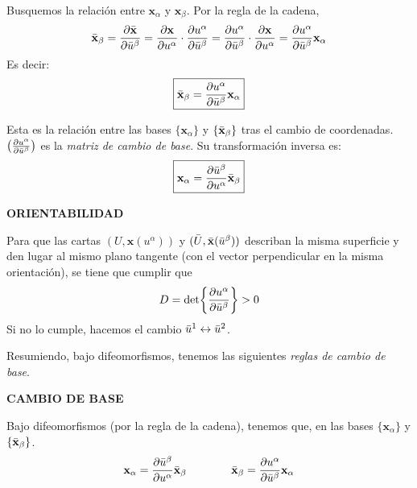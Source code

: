 Busquemos la relación entre $\mathbf{x}_\alpha$ y $\mathbf{x}_\beta$. Por la regla de la cadena,
$$
\Bar{\mathbf{x}}_\beta = \pdv{\Bar{\mathbf{x}}}{\Bar{u}^\beta}=\pdv{\mathbf{x}}{u^\alpha}\cdot \pdv{u^\alpha}{\Bar{u}^\beta}=\pdv{u^\alpha}{\Bar{u}^\beta}\cdot \pdv{\mathbf{x}}{u^\alpha}=\pdv{u^\alpha}{\Bar{u}^\beta}\mathbf{x}_\alpha
$$
Es decir:
$$
\boxed{\Bar{\mathbf{x}}_\beta =\pdv{u^\alpha}{\Bar{u}^\beta}\mathbf{x}_\alpha}
$$

Esta es la relación entre las bases $\{ \mathbf{x}_\alpha  \}$ y $\{ \Bar{\mathbf{x}}_\beta \}$ tras el cambio de coordenadas. $\left ( \pdv{u^\alpha}{\Bar{u}^\beta} \right )$ es la \emph{matriz de cambio de base}. Su transformación inversa es:
$$
\boxed{\mathbf{x}_\alpha=\pdv{\Bar{u}^\beta}{u^\alpha}\Bar{\mathbf{x}}_\beta}
$$
\begin{mybox}
    \begin{center}
        \textbf{ORIENTABILIDAD}
    \end{center}
    Para que las cartas $(U,\mathbf{x}(u^\alpha))$ y $(\Bar{U},\Bar{\mathbf{x}}(\Bar{u}^\beta))$ describan la misma superficie y den lugar al mismo plano tangente (con el vector perpendicular en la misma orientación), se tiene que cumplir que
    $$
    D=\det{\pdv{u^\alpha}{\Bar{u}^\beta}}>0
    $$
    Si no lo cumple, hacemos el cambio $\Bar{u}^1\leftrightarrow \Bar{u}^2$.
\end{mybox}

Resumiendo, bajo difeomorfismos, tenemos las siguientes \emph{reglas de cambio de base}.
\begin{mybox}
    \begin{center}
        \textbf{CAMBIO DE BASE}
    \end{center}
    Bajo difeomorfismos (por la regla de la cadena), tenemos que, en las bases $\{\mathbf{x}_\alpha\}$ y $\{ \Bar{\mathbf{x}}_\beta \}$.
    $$
    \mathbf{x}_\alpha=\pdv{\Bar{u}^\beta}{u^\alpha}\Bar{\mathbf{x}}_\beta \qquad  \qquad \Bar{\mathbf{x}}_\beta=\pdv{u^\alpha}{\Bar{u}^\beta}\mathbf{x}_\alpha
    $$
\end{mybox}

